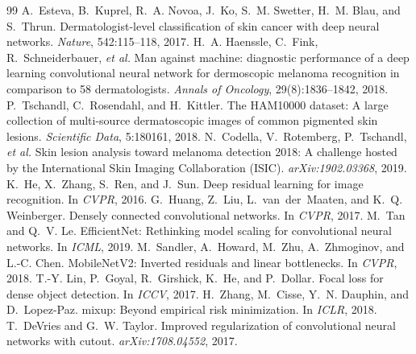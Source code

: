 \documentclass{article}
\begin{document}
\begin{thebibliography}{99}
A.~Esteva, B.~Kuprel, R.~A. Novoa, J.~Ko, S.~M. Swetter, H.~M. Blau, and
S.~Thrun.
\newblock Dermatologist-level classification of skin cancer with deep neural networks.
\newblock \emph{Nature}, 542:115--118, 2017.
H.~A. Haenssle, C.~Fink, R.~Schneiderbauer, \emph{et al.}
\newblock Man against machine: diagnostic performance of a deep learning convolutional neural
network for dermoscopic melanoma recognition in comparison to 58 dermatologists.
\newblock \emph{Annals of Oncology}, 29(8):1836--1842, 2018.
P.~Tschandl, C.~Rosendahl, and H.~Kittler.
\newblock The HAM10000 dataset: A large collection of multi-source dermatoscopic images of common
pigmented skin lesions.
\newblock \emph{Scientific Data}, 5:180161, 2018.
N.~Codella, V.~Rotemberg, P.~Tschandl, \emph{et al.}
\newblock Skin lesion analysis toward melanoma detection 2018: A challenge hosted by the
International Skin Imaging Collaboration (ISIC).
\newblock \emph{arXiv:1902.03368}, 2019.
K.~He, X.~Zhang, S.~Ren, and J.~Sun.
\newblock Deep residual learning for image recognition.
\newblock In \emph{CVPR}, 2016.
G.~Huang, Z.~Liu, L.~van~der~Maaten, and K.~Q. Weinberger.
\newblock Densely connected convolutional networks.
\newblock In \emph{CVPR}, 2017.
M.~Tan and Q.~V. Le.
\newblock EfficientNet: Rethinking model scaling for convolutional neural networks.
\newblock In \emph{ICML}, 2019.
M.~Sandler, A.~Howard, M.~Zhu, A.~Zhmoginov, and L.-C. Chen.
\newblock MobileNetV2: Inverted residuals and linear bottlenecks.
\newblock In \emph{CVPR}, 2018.
T.-Y. Lin, P.~Goyal, R.~Girshick, K.~He, and P.~Dollar.
\newblock Focal loss for dense object detection.
\newblock In \emph{ICCV}, 2017.
H.~Zhang, M.~Cisse, Y.~N. Dauphin, and D.~Lopez-Paz.
\newblock mixup: Beyond empirical risk minimization.
\newblock In \emph{ICLR}, 2018.
T.~DeVries and G.~W. Taylor.
\newblock Improved regularization of convolutional neural networks with cutout.
\newblock \emph{arXiv:1708.04552}, 2017.
\end{thebibliography}
\end{document}
